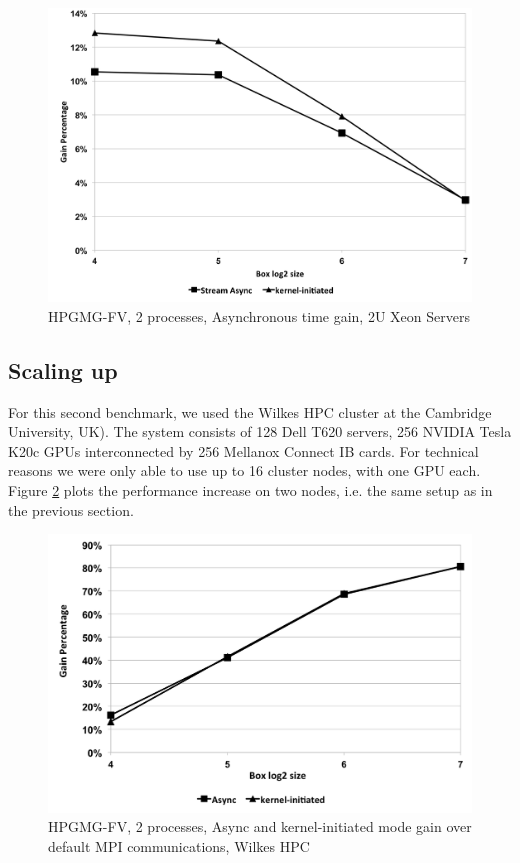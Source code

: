 \documentclass[conference]{IEEEtran}
\begin{document}
\begin{figure}[h]
\centering
\includegraphics[scale=0.3]{gain_ivy.png}
\caption{HPGMG-FV, 2 processes, Asynchronous time gain, 2U Xeon Servers}
\label{fig:gain_ivy}
\end{figure}

\subsection{Scaling up}

For this second benchmark, we used the Wilkes HPC cluster at the Cambridge
University, UK)\cite{wilkes}.
% 
The system consists of 128 Dell T620 servers, 256 NVIDIA Tesla K20c GPUs
interconnected by 256 Mellanox Connect IB cards.
% 
For technical reasons we were only able to use up to 16 cluster nodes,
with one GPU each.
%
Figure \ref{fig:gain_wilkes} plots the performance increase on two nodes,
i.e. the same setup as in the previous section.

\begin{figure}[h]
\includegraphics[scale=0.4]{gain_wilkes.png}
\caption{HPGMG-FV, 2 processes, Async and kernel-initiated mode gain over
  default MPI communications, Wilkes HPC}
\label{fig:gain_wilkes}
\end{figure}
\end{document}

